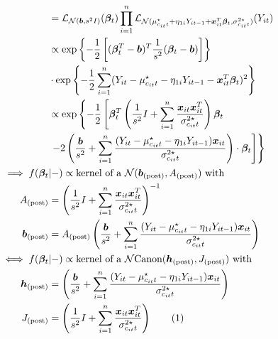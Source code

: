 \documentclass[12pt,	%
	a4paper,		%
	twoside,		%
	openright,		%
	titlepage,%
	]{book}
\theoremstyle{definition}
\begin{document}
\begin{itemize}
\begin{align*}
 & = \law_{\N(\vec{b},s^2 I)}(\vec{\beta}_t) \prod_{i=1}^n \law_{ \N(\mu^\star_{c_{it}t} + \eta_{1i}Y_{it-1} + \vec{x}_{it}^T\vec{\beta}_t,\sigma^{2\star}_{c_{it}t})}(Y_{it}) \\
 & \propto \expp{-\frac{1}{2}\left[ (\vec{\beta}_t^T -\vec{b})^T \frac{1}{s^2} (\vec{\beta}_t-\vec{b}) \right]} \\ & \cdot \expp{-\frac{1}{2} \sum_{i=1}^n ( Y_{it}-\mu^\star_{c_{it}t} -  \eta_{1i}Y_{it-1}-\vec{x}_{it}^T \vec{\beta}_t )^2}\\
 & \propto \exp \left\{-\frac{1}{2} \left[ \vec{\beta}_t^T \left( \frac{1}{s^2}I + \sum_{i=1}^n \frac{\vec{x}_{it}\vec{x}_{it}^T}{\sigma^{2\star}_{c_{it}t}}\right)\vec{\beta}_t \right. \right. \\& \left. \left. - 2\left( \frac{\vec{b}}{s^2} +\sum_{i=1}^n \frac{(Y_{it}- \mu^\star_{c_{it}t}- \eta_{1i}Y_{it-1})\vec{x}_{it}}{\sigma^{2\star}_{c_{it}t}} \right)\cdot \vec{\beta}_t \right] \right\}\\
 \implies f(\vec{\beta}_t&|-) \propto \text{kernel of a $\N(\vec{b}_\post, A_\post)$ with}\\
 A_\post & = \left( \frac{1}{s^2}I + \sum_{i=1}^n \frac{\vec{x}_{it}\vec{x}_{it}^T}{\sigma^{2\star}_{c_{it}t}}\right)^{-1} \\
\vec{b}_\post & = A_\post \left( \frac{\vec{b}}{s^2} +\sum_{i=1}^n \frac{(Y_{it}-\mu^\star_{c_{it}t}- \eta_{1i}Y_{it-1})\vec{x}_{it}}{\sigma^{2\star}_{c_{it}t}} \right) \\
 \iff f(\vec{\beta}_t&|-) \propto \text{kernel of a $\Ncan(\vec{h}_\post, J_\post)$ with}\\
\vec{h}_\post & = \left( \frac{\vec{b}}{s^2} +\sum_{i=1}^n \frac{(Y_{it}-\mu^\star_{c_{it}t}- \eta_{1i}Y_{it-1})\vec{x}_{it}}{\sigma^{2\star}_{c_{it}t}} \right) \\
J_\post & = \left( \frac{1}{s^2}I + \sum_{i=1}^n \frac{\vec{x}_{it}\vec{x}_{it}^T}{\sigma^{2\star}_{c_{it}t}}\right)
\tag{\stepcounter{equation}\theequation}
\end{align*}


\end{itemize}
\end{document}
